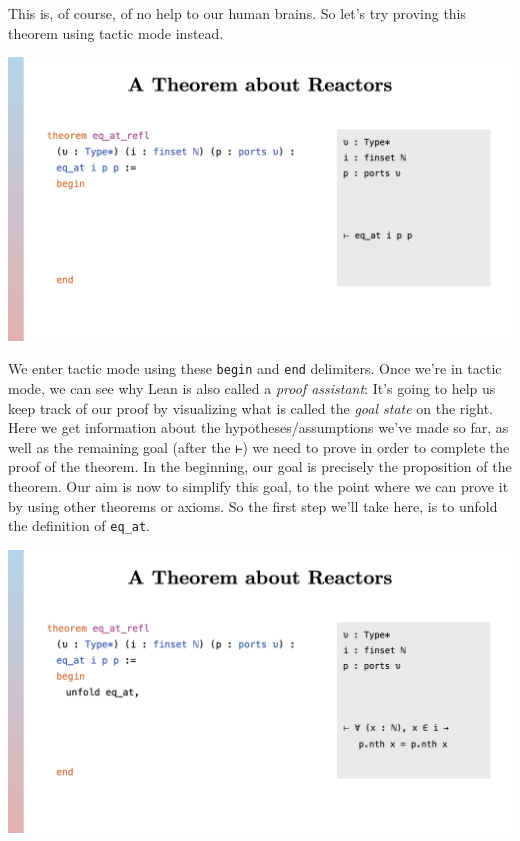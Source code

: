 \documentclass{article}
\begin{document}
This is, of course, of no help to our human brains. So let's try proving
this theorem using tactic mode instead.

\begin{center}
  \includegraphics[width=\columnwidth]{Slides/Slide 13.jpeg}
\end{center}

We enter tactic mode using these \lstinline{begin} and \lstinline{end}
delimiters. Once we're in tactic mode, we can see why Lean is also
called a \emph{proof assistant}: It's going to help us keep track of our
proof by visualizing what is called the \emph{goal state} on the right.
Here we get information about the hypotheses/assumptions we've made so
far, as well as the remaining goal (after the \lstinline{⊢}) we need to
prove in order to complete the proof of the theorem. In the beginning,
our goal is precisely the proposition of the theorem. Our aim is now to
simplify this goal, to the point where we can prove it by using other
theorems or axioms. So the first step we'll take here, is to unfold the
definition of \lstinline{eq_at}.

\begin{center}
  \includegraphics[width=\columnwidth]{Slides/Slide 14.jpeg}
\end{center}
\end{document}
